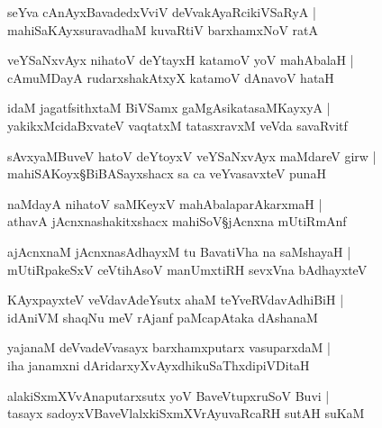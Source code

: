 \begin{shloka}
seYva cAnAyxBavadedxVviV deVvakAyaRcikiVSaRyA |\\
mahiSaKAyxsuravadhaM kuvaRtiV barxhamxNoV ratA
\end{shloka}

\begin{shloka}
veYSaNxvAyx nihatoV deYtayxH katamoV yoV mahAbalaH |\\
cAmuMDayA rudarxshakAtxyX katamoV dAnavoV hataH 
\end{shloka}

\begin{shloka}
idaM jagatfsithxtaM BiVSamx gaMgAsikatasaMKayxyA |\\
yakikxMcidaBxvateV vaqtatxM tatasxravxM veVda savaRvitf
\end{shloka}

\begin{shloka}
sAvxyaMBuveV hatoV deYtoyxV veYSaNxvAyx maMdareV girw |\\
mahiSAKoyx\S BiBASayxshacx sa ca veYvasavxteV punaH 
\end{shloka}

\begin{shloka}
naMdayA nihatoV saMKeyxV mahAbalaparAkarxmaH |\\
athavA jAcnxnashakitxshacx mahiSoV\S jAcnxna mUtiRmAnf
\end{shloka}

\begin{shloka}
ajAcnxnaM jAcnxnasAdhayxM tu BavatiVha na saMshayaH |\\
mUtiRpakeSxV ceVtihAsoV manUmxtiRH sevxVna bAdhayxteV 
\end{shloka}

\begin{shloka}
KAyxpayxteV veVdavAdeYsutx ahaM teYveRVdavAdhiBiH |\\
idAniVM shaqNu meV rAjanf paMcapAtaka dAshanaM 
\end{shloka}

\begin{shloka}
yajanaM deVvadeVvasayx barxhamxputarx vasuparxdaM |\\
iha janamxni dAridarxyXvAyxdhikuSaThxdipiVDitaH 
\end{shloka}

\begin{shloka}
alakiSxmXVvAnaputarxsutx yoV BaveVtupxruSoV Buvi |\\
tasayx sadoyxVBaveVlalxkiSxmXVrAyuvaRcaRH sutAH suKaM
\end{shloka}

